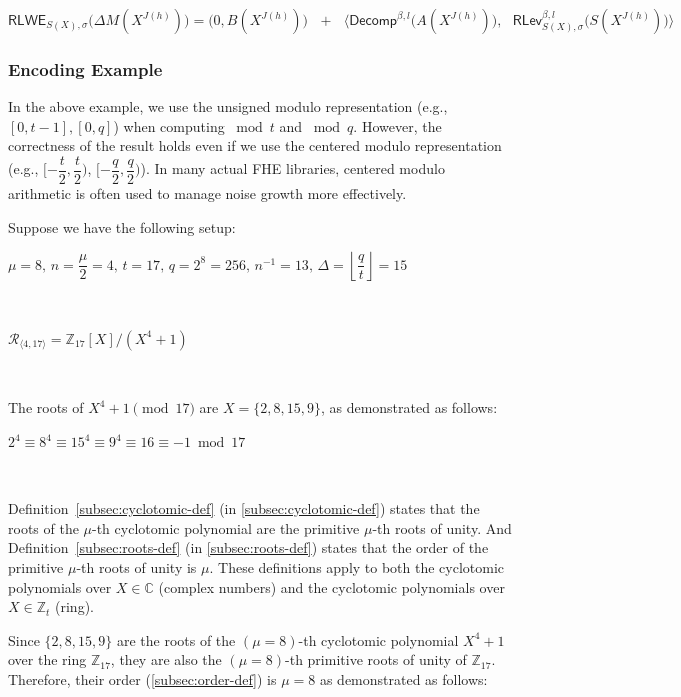 \begin{tcolorbox}[title={\textbf{\tboxlabel{\ref*{subsec:bfv-rotation}} BFV's Homomorphic Rotation of Input Vector Slots}}]
\begin{enumerate}
$\textsf{RLWE}_{S(X),\sigma}\bm{(}\Delta M(X^{J(h)})\bm{)} = \bm{(} 0, B(X^{J(h)}) \bm{)} \text{ } + \text{ } \bm{\langle}  \textsf{Decomp}^{\beta, l}\bm{(}A(X^{J(h)})\bm{)}, \text{ } \textsf{RLev}_{S(X), \sigma}^{\beta, l}\bm{(}S(X^{J(h)})\bm{)} \bm{\rangle}$
\end{enumerate}


\end{tcolorbox}


\subsubsection{Encoding Example}
\label{subsubsec:bfv-batch-encoding-ex}



In the above example, we use the unsigned modulo representation (e.g., $[0, t-1], [0, q]$) when computing $\bmod t$ and $\bmod q$. However, the correctness of the result holds even if we use the centered modulo representation (e.g., $[-\dfrac{t}{2}, \dfrac{t}{2})$, $[-\dfrac{q}{2}, \dfrac{q}{2})$). In many actual FHE libraries, centered modulo arithmetic is often used to manage noise growth more effectively.

Suppose we have the following setup: 

$\mu = 8, \, n = \dfrac{\mu}{2} = 4, \, t = 17, \, q = 2^8 = 256, \, n^{-1} = 13, \, \Delta = \left\lfloor\dfrac{q}{t}\right\rfloor = 15$

$ $

$\mathcal{R}_{\langle 4, 17 \rangle} = \mathbb{Z}_{17}[X] / (X^4 + 1)$

$ $

The roots of $X^4 + 1 \pmod{17}$ are $X = \{2, 8, 15, 9\}$, as demonstrated as follows:

$2^4 \equiv 8^4 \equiv 15^4 \equiv 9^4 \equiv 16 \equiv -1 \bmod{17}$

$ $

Definition~\ref*{subsec:cyclotomic-def} (in \autoref{subsec:cyclotomic-def}) states that the roots of the $\mu$-th cyclotomic polynomial are the primitive $\mu$-th roots of unity. And Definition~\ref*{subsec:roots-def} (in \autoref{subsec:roots-def}) states that the order of the primitive $\mu$-th roots of unity is $\mu$. These definitions apply to both the cyclotomic polynomials over $X\in\mathbb{C}$ (complex numbers) and the cyclotomic polynomials over $X \in \mathbb{Z}_t$ (ring). 

Since $\{2, 8, 15, 9\}$ are the roots of the $(\mu=8)$-th cyclotomic polynomial $X^4 + 1$ over the ring $\mathbb{Z}_{17}$, they are also the $(\mu=8)$-th primitive roots of unity of $\mathbb{Z}_{17}$. Therefore, their order (\autoref{subsec:order-def}) is $\mu=8$ as demonstrated as follows: 


